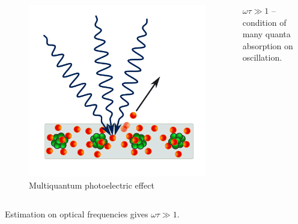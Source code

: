 \documentclass{beamer}
\begin{document}
\begin{frame}
\begin{columns}
			\begin{figure}
				\centering
				\includegraphics[width=0.7\linewidth]{res/multiphoton.png}
				\caption*{Multiquantum photoelectric effect}
			\end{figure}
			\footnotesize
			$\omega \tau \gg 1$ -- condition of many quanta absorption on oscillation.
		\end{columns}
		\vspace{10pt}
		Estimation on optical frequencies gives $\omega \tau \gg 1$.
		
	\end{frame}
	
\end{document}
